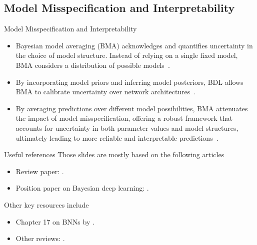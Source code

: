 \documentclass[9pt,handout]{beamer}
\begin{document}
\subsection{Model Misspecification and Interpretability}

\begin{frame}{Model Misspecification and Interpretability}
\begin{itemize}[<+->]
	\item \alert{Bayesian model averaging (BMA)} acknowledges and quantifies uncertainty in the choice of model structure. Instead of relying on a single fixed model, BMA considers a distribution of possible models~\citep{hoeting1998bayesian,hoeting1999bayesian, wasserman2000bayesian}. 
	\item By incorporating model priors and inferring model posteriors, BDL allows BMA to \alert{calibrate uncertainty over network architectures}~\citep{hubin2019combining,skaaret2023sparsifying}. 
	\item By averaging predictions over different model possibilities, BMA \alert{attenuates} the impact of \alert{model misspecification}, offering a robust framework that accounts for uncertainty in both parameter values and model structures, ultimately leading to more \alert{reliable and interpretable predictions}~\citep{hubin2021flexible, wang2023m2ib,bouchiat2023laplace}.
\end{itemize}
\end{frame}



\begin{frame}{Useful references}
Those slides are mostly based on the following articles
\begin{itemize}[<+->]
	\item \alert{Review paper}: \citet{arbel2023primer}.
	\item \alert{Position paper} on Bayesian deep learning: \citet{papamarkou2024position}.
\end{itemize}
Other key resources include
\begin{itemize}[<+->]
	\item \alert{Chapter 17 on BNNs} by \citet{murphy2023probabilisticMLadvanced}.
	\item \alert{Other reviews}: \citet{jospin2020hands,abdar2021review,goan2020bayesian,fortuin2021priors,ashukha2020pitfalls,band2021benchmarking,nado2021uncertainty}.
\end{itemize}
\end{frame}
	
\end{document}
